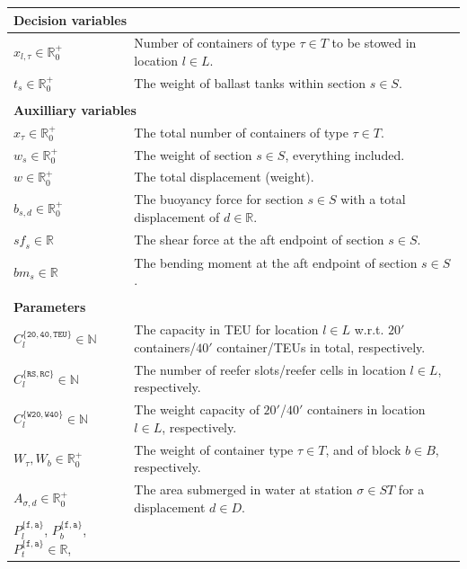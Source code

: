 \documentclass[citeauthoryear]{llncs}
\newcommand{\trt}[1]{\texttt{#1}}
\newcommand{\mi}{\mathit}
\begin{document}
\begin{longtable}
{p{3.7cm}p{11.5cm}}
\multicolumn{2}{l}{\textbf{Decision variables}}\\
\hline\noalign{\smallskip}
$x_{l,\tau}\in \mathbb{R}^+_0$		& {Number of containers of type $\tau\in T$ to be stowed in location $l\in L$}.\\
$t_s\in \mathbb{R}^+_0$						& {The weight of ballast tanks within section $s\in S$.}\\
\\
\multicolumn{2}{l}{\textbf{Auxilliary variables}}\\
\hline\noalign{\smallskip}
$x_\tau\in \mathbb{R}^+_0$ 				& {The total number of containers of type $\tau\in T$.}\\
$w_s\in \mathbb{R}^+_0$						& {The weight of section $s\in S$, everything included.}\\
$w\in \mathbb{R}^+_0$							& {The total displacement (weight).}\\
$b_{s,d} \in\mathbb{R}^+_0$ 			& {The buoyancy force for section $s \in S$ with a total displacement of $d\in \mathbb{R}$.}\\
$\mi{sf}_s\in \mathbb{R}$ 				& {The shear force at the aft endpoint of section $s\in S$.}\\
$\mi{bm}_s\in \mathbb{R}$ 				& {The bending moment at the aft endpoint of section $s\in S$.}\\
\\
\multicolumn{2}{l}{\textbf{Parameters}}\\
\hline\noalign{\smallskip}
$C_l^{\{\trt{20}, \trt{40}, \trt{TEU}\}}\in \mathbb{N}$ 		& {The capacity in TEU for location $l\in L$ w.r.t. $20'$ containers/$40'$ container/TEUs in total, respectively.} \\
$C_l^{\{\trt{RS}, \trt{RC}\}}\in \mathbb{N}$								& {The number of reefer slots/reefer cells in location $l\in L$, respectively.}\\
$C_l^{\{\trt{W20}, \trt{W40}\}}\in \mathbb{N}$							& {The weight capacity of  $20'$/$40'$ containers in location $l\in L$, respectively.}\\
$W_\tau, W_b\in \mathbb{R}^+_0$															& {The weight of container type $\tau\in T$, and of block $b\in B$, respectively.} \\
$A_{\sigma, d}\in \mathbb{R}^+_0$ 													&	{The area submerged in water at station $\sigma\in ST$ for a displacement $d\in D$.}\\
$P^{\{\trt{f},\trt{a}\}}_{l}$, $P^{\{\trt{f},\trt{a}\}}_{b}$, $P^{\{\trt{f},\trt{a}\}}_{t}\in \mathbb{R}$, 

\end{longtable}
\end{document}
